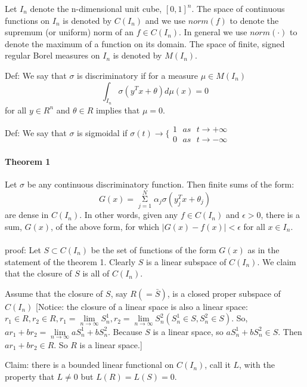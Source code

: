 Let $I_n$ denote the n-dimensional unit cube, $[0,1]^n$. The space of continuous functions on $I_n$ is denoted by $C(I_n)$ and we use $norm(f)$ to denote the supremum (or uniform) norm of an $f\in C(I_n)$. In general we use $norm(\cdot)$ to denote the maximum of a function on its domain. The space of finite, signed regular Borel measures on $I_n$ is denoted by $M(I_n)$.


Def: We say that $\sigma$ is discriminatory if for a measure $\mu\in M(I_n)$
$$\int_{I_n}\sigma(y^Tx+\theta)d\mu(x)=0$$
for all $y\in R^n$ and $\theta\in R$ implies that $\mu=0$.


Def: We say that $\sigma$ is sigmoidal if
$\sigma(t)\rightarrow \Big\{
\begin{aligned}
1  \ \ \ as \ \ \ t\rightarrow + \infty \\
0  \ \ \ as \ \ \ t\rightarrow - \infty
\end{aligned}$

\paragraph{Theorem 1}

Let $\sigma$ be any continuous discriminatory function. Then finite sums of the form:
$$G(x)=\mathop{\Sigma}\limits_{j=1}^N\alpha_j\sigma(y_j^Tx+\theta_j)$$
are dense in $C(I_n)$. In other words, given any $f\in C(I_n)$ and $\epsilon>0$, there is a sum, $G(x)$, of the above form, for which $|G(x)-f(x)|<\epsilon$ for all $x\in I_n$.
~\\~\\proof: Let $S\subset C(I_n)$ be the set of functions of the form $G(x)$ as in the statement of the theorem 1. Clearly $S$ is a linear subspace of $C(I_n)$. We claim that the closure of $S$ is all of $C(I_n)$.

Assume that the closure of $S$, say $R(=\bar{S})$, is a closed proper subspace of $C(I_n)$ [Notice: the closure of a linear space is also a linear space: $r_1\in R,r_2\in R, r_1=\mathop{lim}\limits_{n\rightarrow \infty}S_n^1, r_2=\mathop{lim}\limits_{n\rightarrow \infty}S_n^2 (S_n^1\in S, S_n^2\in S)$. So, $ar_1+br_2=\mathop{lim}\limits_{n\rightarrow \infty}aS_n^1+bS_n^2$. Because $S$ is a linear space, so $aS_n^1+bS_n^2\in S$. Then $ar_1+br_2\in R$. So $R$ is a linear space.]


Claim: there is a bounded linear functional on $C(I_n)$, call it $L$, with the property that $L\neq 0$ but $L(R)=L(S)=0$.


